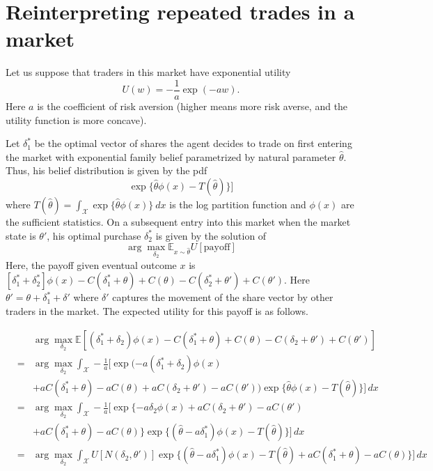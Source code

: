 \documentclass[12pt]{article}
\newcommand{\E}{\mathbb{E}}
\begin{document}
\section*{Reinterpreting repeated trades in a market}
Let us suppose that traders in this market have exponential utility \[
U(w) = -\frac{1}{a} \exp(-aw).
\]
%
Here $a$ is the coefficient of risk aversion (higher means more risk averse, and the utility function is more concave).

Let $\delta_{1}^{*}$ be the optimal vector of shares the agent decides to trade on first entering the market with exponential family belief parametrized by natural parameter $\hat{\theta}$. Thus, his belief distribution is given by the pdf $$\exp\{\hat{\theta} \phi(x) - T(\hat{\theta})\}]$$ where $T(\hat{\theta}) =\int_{\mathcal{X}}\exp\{\hat{\theta} \phi(x)\}\ dx$ is the log partition function and $\phi(x)$ are the sufficient statistics.
On a subsequent entry into this market when the market state is $\theta'$, his optimal purchase $\delta_{2}^{*}$ is given by the solution of
$$\arg\max_{\delta_{2}} \E_{x\sim \hat{\theta}} U[\mathrm{payoff}]$$
Here, the payoff given eventual outcome $x$ is  $[\delta_{1}^{*}+\delta_{2}^{*} ]\phi(x) - C(\delta_{1}^{*} + \theta) + C(\theta)- C(\delta_{2}^{*} + \theta') + C(\theta')$. Here $\theta' = \theta+\delta_{1}^{*}+\delta'$ where $\delta'$ captures the movement of the share vector by other traders in the market. 
The expected utility for this payoff is as follows.

\begin{eqnarray*}
&   & \arg\max_{\delta_{2}}\E\left[ (\delta_{1}^{*}+\delta_{2} )\phi(x) - C(\delta_{1}^{*} + \theta) + C(\theta)- C(\delta_{2} + \theta') + C(\theta') \right] \\
& = & \arg\max_{\delta_{2}}\int_{\mathcal{X}} -\frac{1}{a} [\exp(-a (\delta_{1}^{*}+\delta_{2} )\phi(x) \\
&  & + a C(\delta_{1}^{*} + \theta) -a C(\theta)+a C(\delta_{2} + \theta') -a C(\theta')) \exp\{\hat{\theta} \phi(x) - T(\hat{\theta})\}]\, dx \\
& = & \arg\max_{\delta_{2}}\int_{\mathcal{X}} -\frac{1}{a} [\exp\{-a \delta_{2} \phi(x)+a C(\delta_{2} + \theta') -a C(\theta') \\
&  & + a C(\delta_{1}^{*} + \theta) -a C(\theta)\} \exp\{(\hat{\theta}-a \delta_{1}^{*}) \phi(x) - T(\hat{\theta})\}]\, dx \\
& = & \arg\max_{\delta_{2}}\int_{\mathcal{X}} U[N(\delta_{2},\theta')] \exp\{(\hat{\theta}-a \delta_{1}^{*}) \phi(x) - T(\hat{\theta})+ a C(\delta_{1}^{*} + \theta) -a C(\theta)\}]\, dx 
\end{eqnarray*}
\end{document}
